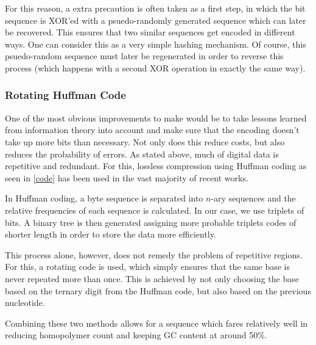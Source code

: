 \documentclass[a4paper,conference]{IEEEtran}
\begin{document}
For this reason, a extra precaution is often taken as a first step, in which the bit sequence is XOR'ed with a psuedo-randomly generated sequence which can later be recovered. This ensures that two similar sequences get encoded in different ways. One can consider this as a very simple hashing mechanism. Of course, this psuedo-random sequence must later be regenerated in order to reverse this process (which happens with a second XOR operation in exactly the same way).

\subsubsection{Rotating Huffman Code}
One of the most obvious improvements to make would be to take lessons learned from information theory into account and make sure that the encoding doesn't take up more bits than necessary. Not only does this reduce costs, but also reduces the probability of errors. As stated above, much of digital data is repetitive and redundant. For this, lossless compression using Huffman coding as seen in \ref{code} has been used in the vast majority of recent works.

In Huffman coding, a byte sequence is separated into $n$-ary sequences and the relative frequencies of each sequence is calculated. In our case, we use triplets of bits. A binary tree is then generated assigning more probable triplets codes of shorter length in order to store the data more efficiently.

This process alone, however, does not remedy the problem of repetitive regions. For this, a rotating code is used, which simply ensures that the same base is never repeated more than once. This is achieved by not only choosing the base based on the ternary digit from the Huffman code, but also based on the previous nucleotide.

Combining these two methods allows for a sequence which fares relatively well in reducing homopolymer count and keeping GC content at around 50\%.
\end{document}
